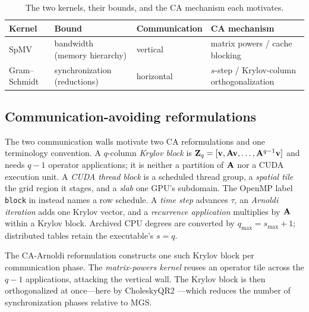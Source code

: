 \begin{table}[htbp!]
\centering
\small
\caption{The two kernels, their bounds, and the CA mechanism each motivates.}
\label{tab:two-mechanisms}
\begin{tabular}{@{}lllp{4.0cm}@{}}
\toprule
\textbf{Kernel} & \textbf{Bound} & \textbf{Communication} & \textbf{CA mechanism} \\
\midrule
SpMV & bandwidth (memory hierarchy) & vertical & matrix powers / cache blocking \\
Gram--Schmidt & synchronization (reductions) & horizontal & $s$-step / Krylov-column orthogonalization \\
\bottomrule
\end{tabular}
\end{table}

\subsection{Communication-avoiding reformulations}\label{sec:ksm-ca}

The two communication walls motivate two CA reformulations and one terminology convention. A $q$-column \emph{Krylov block} is $\mathbf{Z}_q=[\mathbf{v},\mathbf{A}\mathbf{v},\ldots,\mathbf{A}^{q-1}\mathbf{v}]$ and needs $q-1$ operator applications; it is neither a partition of $\mathbf{A}$ nor a CUDA execution unit. A \emph{CUDA thread block} is a scheduled thread group, a \emph{spatial tile} the grid region it stages, and a \emph{slab} one GPU's subdomain. The OpenMP label \texttt{block} in  instead names a row schedule. A \emph{time step} advances $\tau$, an \emph{Arnoldi iteration} adds one Krylov vector, and a \emph{recurrence application} multiplies by $\mathbf{A}$ within a Krylov block. Archived CPU degrees are converted by $q_{\max}=s_{\max}+1$; distributed tables retain the executable's $s=q$.

The CA-Arnoldi reformulation \cite{hoemmen-2010,demmel-2008,carson-2015} constructs one such Krylov block per communication phase. The \emph{matrix-powers kernel} \cite{mohiyuddin-2009} reuses an operator tile across the $q-1$ applications, attacking the vertical wall. The
Krylov block is then orthogonalized at once---here by CholeskyQR2 \cite{yamamoto-2015}---which reduces the number of synchronization phases relative to MGS.

